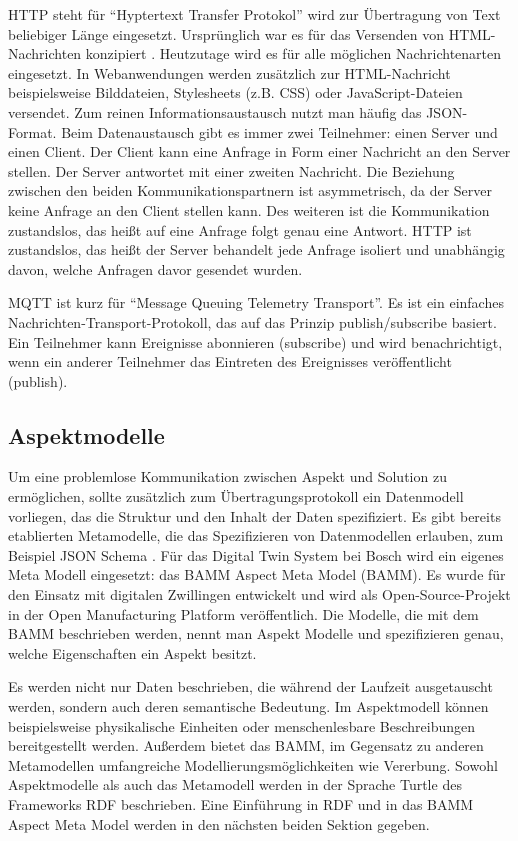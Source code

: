 	HTTP steht für "`Hyptertext Transfer Protokol"' wird zur Übertragung von Text beliebiger Länge eingesetzt. Ursprünglich war es für das Versenden von HTML-Nachrichten konzipiert \cite{bernerslee1991http}. Heutzutage wird es für alle möglichen Nachrichtenarten eingesetzt. In Webanwendungen werden zusätzlich zur HTML-Nachricht beispielsweise Bilddateien, Stylesheets (z.B. CSS) oder JavaScript-Dateien versendet. Zum reinen Informationsaustausch nutzt man häufig das JSON-Format.
	Beim Datenaustausch gibt es immer zwei Teilnehmer: einen Server und einen Client. Der Client kann eine Anfrage in Form einer Nachricht an den Server stellen. Der Server antwortet mit einer zweiten Nachricht. Die Beziehung zwischen den beiden Kommunikationspartnern ist asymmetrisch, da der Server keine Anfrage an den Client stellen kann. Des weiteren ist die Kommunikation zustandslos, das heißt auf eine Anfrage folgt genau eine Antwort. HTTP ist zustandslos, das heißt der Server behandelt jede Anfrage isoliert und unabhängig davon, welche Anfragen davor gesendet wurden. \cite[vgl.][]{fielding1999http}
	
	MQTT ist kurz für "`Message Queuing Telemetry Transport"'. Es ist ein einfaches Nachrichten-Transport-Protokoll, das auf das Prinzip publish/subscribe basiert. Ein Teilnehmer kann Ereignisse abonnieren (subscribe) und wird benachrichtigt, wenn ein anderer Teilnehmer das Eintreten des Ereignisses veröffentlicht (publish). \cite[vgl.][]{banks2019mqtt}
	
	\subsection{Aspektmodelle} \label{sec:aspektmodelle}
	
	Um eine problemlose Kommunikation zwischen Aspekt und Solution zu ermöglichen, sollte zusätzlich zum Übertragungsprotokoll ein Datenmodell vorliegen, das die Struktur und den Inhalt der Daten spezifiziert. Es gibt bereits etablierten Metamodelle, die das Spezifizieren von Datenmodellen erlauben, zum Beispiel JSON Schema \cite[vgl.][]{wrigth2022jsonschema}. Für das Digital Twin System bei Bosch wird ein eigenes Meta Modell eingesetzt: das BAMM Aspect Meta Model (BAMM). Es wurde für den Einsatz mit digitalen Zwillingen entwickelt und wird als Open-Source-Projekt in der Open Manufacturing Platform veröffentlich. Die Modelle, die mit dem BAMM beschrieben werden, nennt man Aspekt Modelle und spezifizieren genau, welche Eigenschaften ein Aspekt besitzt. 
	
	Es werden nicht nur Daten beschrieben, die während der Laufzeit ausgetauscht werden, sondern auch deren semantische Bedeutung. Im Aspektmodell können beispielsweise physikalische Einheiten oder menschenlesbare Beschreibungen bereitgestellt werden. Außerdem bietet das BAMM, im Gegensatz zu anderen Metamodellen umfangreiche Modellierungsmöglichkeiten wie Vererbung. Sowohl Aspektmodelle als auch das Metamodell werden in der Sprache Turtle des Frameworks RDF beschrieben. Eine Einführung in RDF und in das BAMM Aspect Meta Model werden in den nächsten beiden Sektion gegeben.
	
